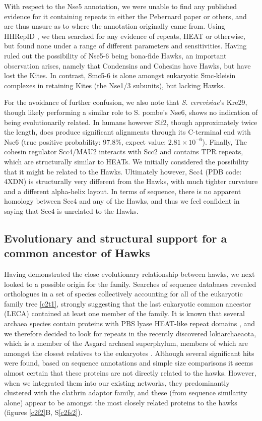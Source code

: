 \documentclass[a4paper,11pt,twoside,openright]{scrbook}
\begin{document}
With respect to the Nse5 annotation, we were unable to find any published evidence for it containing repeats in either the Pebernard paper or others, and are thus unsure as to where the annotation originally came from. Using HHRepID \cite{Biegert2008}, we then searched for any evidence of repeats, HEAT or otherwise, but found none under a range of different parameters and sensitivities. Having ruled out the possibility of Nse5-6 being bona-fide Hawks, an important observation arises, namely that Condensins and Cohesins have Hawks, but have lost the Kites. In contrast, Smc5-6 is alone amongst eukaryotic Smc-kleisin complexes in retaining Kites (the Nse1/3 subunits), but lacking Hawks.

For the avoidance of further confusion, we also note that \textit{S. cerevisiae}'s Kre29, though likely performing a similar role to S. pombe’s Nse6, shows no indication of being evolutionarily related. In humans however Slf2, though approximately twice the length, does produce significant alignments through its C-terminal end with Nse6 (true positive probability: 97.8\%, expect value: $2.81\times10^{-6}$). Finally, The cohesin regulator Scc4/MAU2 interacts with Scc2 and contains TPR repeats, which are structurally similar to HEATs. We initially considered the possibility that it might be related to the Hawks. Ultimately however, Scc4 (PDB code: 4XDN) is structurally very different from the Hawks, with much tighter curvature and a different alpha-helix layout. In terms of sequence, there is no apparent homology between Scc4 and any of the Hawks, and thus we feel confident in saying that Scc4 is unrelated to the Hawks.

\subsection{Evolutionary and structural support for a common ancestor of Hawks}

Having demonstrated the close evolutionary relationship between hawks, we next looked to a possible origin for the family. Searches of sequence databases revealed orthologues in a set of species collectively accounting for all of the eukaryotic family tree \ref{c2t1}, strongly suggesting that the last eukaryotic common ancestor (LECA) contained at least one member of the family. It is known that several archaea species contain proteins with PBS lyase HEAT-like repeat domains \cite{Schlesner2009}, and we therefore decided to look for repeats in the recently discovered lokiarchaeaota, which is a member of the Asgard archaeal superphylum, members of which are amongst the closest relatives to the eukaryotes \cite{Spang2015,Zaremba-Niedzwiedzka2017}. Although several significant hits were found, based on sequence annotations and simple size comparisons it seems almost certain that these proteins are not directly related to the hawks. However, when we integrated them into our existing networks, they predominantly clustered with the clathrin adaptor family, and these (from sequence similarity alone) appear to be amongst the most closely related proteins to the hawks (figures \ref{c2f2}B, S\ref{c2fs2}).
\end{document}

